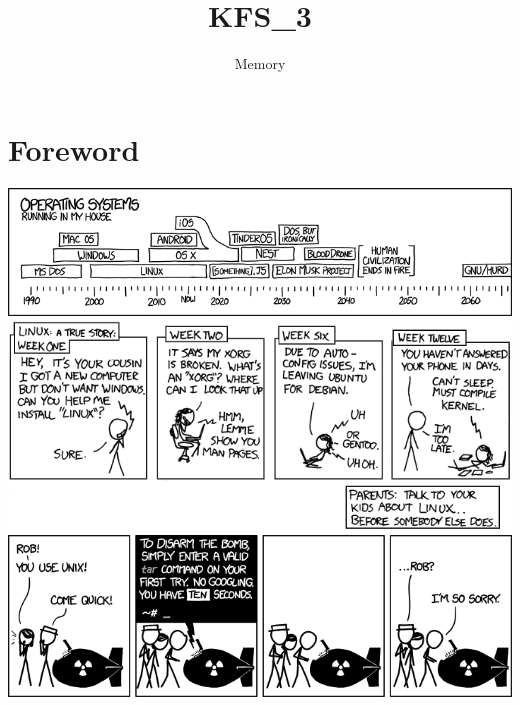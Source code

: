 \documentclass{42-en}
\begin{document}
                           \title{KFS\_3}
                          \subtitle{Memory}


\maketitle

\tableofcontents

\newpage
\chapter{Foreword}
	\includegraphics[width=16cm]{./operating_systems.png}
	\includegraphics[width=16cm]{./cautionary.png}
	\includegraphics[width=16cm]{./tar.png}
\end{document}
